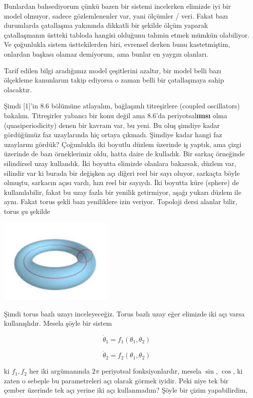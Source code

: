 \documentclass[12pt,fleqn]{article}\usepackage{../../common}
\begin{document}
Bunlardan bahsediyorum çünkü bazen bir sistemi incelerken elimizde iyi bir
model olmuyor, sadece gözlemlenenler var, yani ölçümler / veri. Fakat bazı
durumlarda çatallaşma yakınında dikkatli bir şekilde ölçüm yaparak
çatallaşmanın üstteki tabloda hangisi olduğunu tahmin etmek mümkün
olabiliyor. Ve çoğunlukla sistem üsttekilerden biri, evrensel derken bunu
kastetmiştim, onlardan başkası olamaz demiyorum, ama bunlar en yaygın
olanları. 

Tarif edilen bilgi aradığımız model çeşitlerini azaltır, bir model belli
bazı ölçekleme kanunlarını takip ediyorsa o zaman belli bir çatallaşmaya
sahip olacaktır. 

Şimdi [1]'in 8.6 bölümüne atlayalım, bağlaşımlı titreşirlere (coupled
oscillators) bakalım. Titreşirler yabancı bir konu değil ama 8.6'da
periyotsal\textbf{ımsı} olma (quasiperiodicity) denen bir kavram var, bu
yeni. Bu oluş şimdiye kadar gördüğümüz faz uzaylarında hiç ortaya
çıkmadı. Şimdiye kadar hangi faz uzaylarını gördük? Çoğunlukla iki boyutlu
düzlem üzerinde iş yaptık, ama çizgi üzerinde de bazı örneklerimiz oldu,
hatta daire de kulladık. Bir sarkaç örneğinde silindirsel uzay
kullandık. İki boyutta elimizde olanlara bakarsak, düzlem var, silindir var
ki burada bir değişken açı diğeri reel bir sayı oluyor, sarkaçta böyle
olmuştu, sarkacın açısı vardı, hızı reel bir sayıydı. İki boyutta küre
(sphere) de kullanılabilir, fakat bu uzay fazla bir yenilik getirmiyor,
aşağı yukarı düzlem ile aynı. Fakat torus şekli bazı yeniliklere izin
veriyor. Topoloji dersi alanlar bilir, torus şu şekilde

\includegraphics[width=15em]{torus.jpg}

Şimdi torus bazlı uzayı inceleyeceğiz. Torus bazlı uzay eğer elimizde iki
açı varsa kullanışlıdır. Mesela şöyle bir sistem

$$ \dot{\theta}_1 = f_1 (\theta_1,\theta_2)$$

$$ \dot{\theta}_2 = f_2 (\theta_1,\theta_2)$$

ki $f_1,f_2$ her iki argümanında $2\pi$ periyotsal fonksiyonlardır, mesela
$\sin$, $\cos$, ki zaten o sebeple bu parametreleri açı olarak görmek
iyidir. Peki niye tek bir çember üzerinde tek açı yerine iki açı
kullanmadım? Şöyle bir çizim yapabilirdim,
\end{document}
